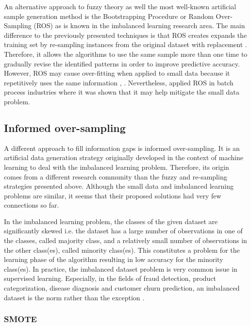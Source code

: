 \documentclass[parskip=full]{scrartcl}
\begin{document}
An alternative approach to fuzzy theory as well the most well-known artificial
sample generation method is the Bootstrapping Procedure \cite{AbdulLateh.2017}
or Random Over-Sampling (ROS) as is known in the imbalanced learning research
area. The main difference to the previously presented techniques is that ROS
creates expands the training set by re-sampling instances from the original
dataset with replacement \cite{Efron.1993}. Therefore, it allows the algorithms
to use the same sample more than one time to gradually revise the identified
patterns in order to improve predictive accuracy. However, ROS may cause
over-fitting when applied to small data because it repetitively uses the same
information \cite{Tsai.2015}, \cite{Li.2018}. Nevertheless, \cite{Ivanescu.2006}
applied ROS in batch process industries where it was shown that it may help
mitigate the small data problem.

\subsection{Informed over-sampling}

A different approach to fill information gaps is informed over-sampling. It is
an artificial data generation strategy originally developed in the context of
machine learning to deal with the imbalanced learning problem. Therefore, its
origin comes from a different research community than the fuzzy and re-sampling
strategies presented above. Although the small data and imbalanced learning
problems are similar, it seems that their proposed solutions had very few
connections so far.

In the imbalanced learning problem, the classes of the given dataset are
significantly skewed i.e. the dataset has a large number of observations in one
of the classes, called majority class, and a relatively small number of
observations in the other class(es), called minority class(es). This constitutes
a problem for the learning phase of the algorithm resulting in low accuracy for
the minority class(es). In practice, the imbalanced dataset problem is very
common issue in supervised learning. Especially, in the fields of fraud
detection, product categorization, disease diagnosis and customer churn prediction, an imbalanced dataset is the norm rather than the exception \cite{He.2013,Chen.2012,Verbeke.2012}.

\subsubsection{SMOTE}
\end{document}
